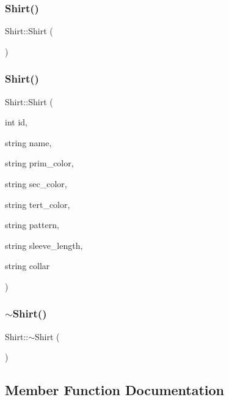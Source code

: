 \subsubsection{\texorpdfstring{Shirt()}{Shirt()}\hspace{0.1cm}{\footnotesize\ttfamily [1/2]}}
{\footnotesize\ttfamily Shirt\+::\+Shirt (\begin{DoxyParamCaption}{ }\end{DoxyParamCaption})}

\mbox{\label{classShirt_a5df3975569b7f5874a905d31e4056b7b}} 
\subsubsection{\texorpdfstring{Shirt()}{Shirt()}\hspace{0.1cm}{\footnotesize\ttfamily [2/2]}}
{\footnotesize\ttfamily Shirt\+::\+Shirt (\begin{DoxyParamCaption}\item[{int}]{id,  }\item[{string}]{name,  }\item[{string}]{prim\+\_\+color,  }\item[{string}]{sec\+\_\+color,  }\item[{string}]{tert\+\_\+color,  }\item[{string}]{pattern,  }\item[{string}]{sleeve\+\_\+length,  }\item[{string}]{collar }\end{DoxyParamCaption})}

\mbox{\label{classShirt_a2cff1b945a014210e8bf009eb4269695}} 
\subsubsection{\texorpdfstring{$\sim$\+Shirt()}{~Shirt()}}
{\footnotesize\ttfamily Shirt\+::$\sim$\+Shirt (\begin{DoxyParamCaption}{ }\end{DoxyParamCaption})\hspace{0.3cm}{\ttfamily [virtual]}}



\subsection{Member Function Documentation}
\mbox{\label{classClothes_a3f6dac172f333126d19010f85ec44e4c}} 

